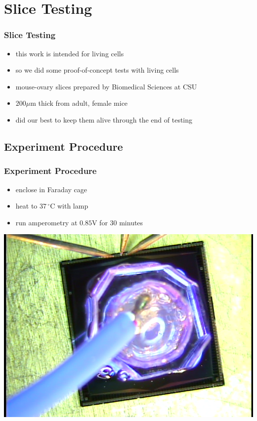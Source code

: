 \documentclass[10pt]{beamer}
\begin{document}
\section{Slice Testing}
\begin{frame}
	\frametitle{Slice Testing}
	\begin{itemize}
		\item this work is intended for living cells
		\item so we did some proof-of-concept tests with living cells
		\item mouse-ovary slices prepared by Biomedical Sciences at CSU
		\item $200 \mu \mathrm{m}$ thick from adult, female mice
		\item did our best to keep them alive through the end of testing
	\end{itemize}
\end{frame}

\subsection{Experiment Procedure}
\begin{frame}
	\frametitle{Experiment Procedure}
	\begin{itemize}
		\item enclose in Faraday cage
		\item heat to $37\,^{\circ}\mathrm{C}$ with lamp
		\item run amperometry at $0.85 \mathrm{V}$ for 30 minutes
	\end{itemize}
	\includegraphics[width=0.8\linewidth]{figures/slice-top.png}
\end{frame}
\end{document}
